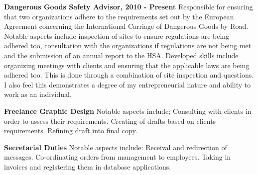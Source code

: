\documentclass{res}
\begin{document}
\begin{resume}
    {\bf Dangerous Goods Safety Advisor, 2010 - Present} Responsible for ensuring that two organizations adhere to the requirements set out by the European Agreement concerning the International Carriage of Dangerous Goods by Road. Notable aspects include inspection of sites to ensure regulations are being adhered too, consultation with the organizations if regulations are not being met and the submission of an annual report to the HSA. Developed skills include organizing meetings with clients and ensuring that the applicable laws are being adhered too. This is done through a combination of site inspection and questions. I also feel this demonstrates a degree of my entrepreneurial nature and ability to work as an individual.
 
    {\bf Freelance Graphic Design} Notable aspects include; Consulting with clients in order to assess their requirements. Creating of drafts based on clients requirements. Refining draft into final copy.
 
    {\bf Secretarial Duties} Notable aspects include: Receival and redirection of messages. Co-ordinating orders from management to employees. Taking in invoices and registering them in database applications.

 
   
 


     

\end{resume}
\end{document}

